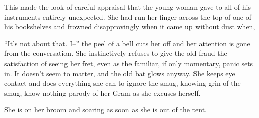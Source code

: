 \documentclass[../FGP.tex]{subfiles}
\begin{document}
\begin{fragment}This made the look of careful appraisal that the young woman gave to all of his instruments entirely unexpected. She had run her finger across the top of one of his bookshelves and frowned disapprovingly when it came up without dust when, \end{fragment}

\begin{fragment}
``It's not about that. I--'' the peel of a bell cuts her off and her attention is gone from the conversation. She instinctively refuses to give the old fraud the satisfaction of seeing her fret, even as the familiar, if only momentary, panic sets in. It doesn't seem to matter, and the old bat glows anyway. She keeps eye contact and does everything she can to ignore the smug, knowing grin of the smug, know-nothing parody of her Gram as she excuses herself.   

She is on her broom and soaring as soon as she is out of the tent. 
\end{fragment}
\end{document}
